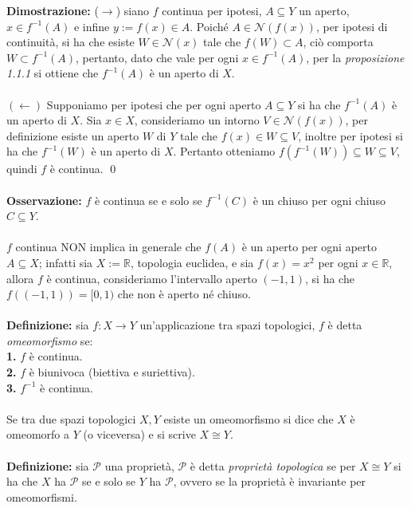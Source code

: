 \documentclass{article}
\begin{document}
\textbf{Dimostrazione:} ($\rightarrow$) siano $f$ continua per ipotesi, $A \subseteq Y$ un aperto, \\ $x \in f^{-1}(A)$ e infine $y := f(x) \in A$. Poiché $A \in \mathcal{N}(f(x))$, per ipotesi di continuità, si ha che esiste $W \in \mathcal{N}(x)$ tale che $f(W) \subset A$, ciò comporta $W \subset f^{-1}(A)$, pertanto, dato che vale per ogni $x \in f^{-1}(A)$, per la \textit{proposizione 1.1.1} si ottiene che $f^{-1}(A)$ è un aperto di $X$. \\ \\
$(\leftarrow)$ Supponiamo per ipotesi che per ogni aperto $A \subseteq Y$ si ha che $f^{-1}(A)$ è un aperto di $X$. Sia $x \in X$, consideriamo un intorno $V \in \mathcal{N}(f(x))$, per definizione esiste un aperto $W$ di $Y$ tale che $f(x) \in W \subseteq V$, inoltre per ipotesi si ha che $f^{-1}(W)$ è un aperto di $X$. Pertanto otteniamo $f(f^{-1}(W)) \subseteq W \subseteq V$, quindi $f$ è continua. \qed \\ \\
\textbf{Osservazione:} $f$ è continua se e solo se $f^{-1}(C)$ è un chiuso per ogni chiuso $C \subseteq Y$. \\ \\
$f$ continua NON implica in generale che $f(A)$ è un aperto per ogni aperto $A \subseteq X$; infatti sia $X := \mathbb{R}$, topologia euclidea, e sia $f(x) = x^2$ per ogni $x \in \mathbb{R}$, allora $f$ è continua, consideriamo l'intervallo aperto $(-1, 1)$, si ha che $f((-1, 1)) = [0, 1)$ che non è aperto né chiuso. \\ \\
\textbf{Definizione:} sia $f : X \longrightarrow Y$ un'applicazione tra spazi topologici, $f$ è detta \textit{omeomorfismo} se: \\
\textbf{1.} $f$ è continua. \\
\textbf{2.} $f$ è biunivoca (biettiva e suriettiva). \\
\textbf{3.} $f^{-1}$ è continua. \\ \\
Se tra due spazi topologici $X, Y$ esiste un omeomorfismo si dice che $X$ è omeomorfo a $Y$ (o viceversa) e si scrive $X \cong Y$. \\ \\
\textbf{Definizione:} sia $\mathcal{P}$ una proprietà, $\mathcal{P}$ è detta \textit{proprietà topologica} se per $X \cong Y$ si ha che $X$ ha $\mathcal{P}$ se e solo se $Y$ ha $\mathcal{P}$, ovvero se la proprietà è invariante per omeomorfismi. \\ \\
\end{document}
